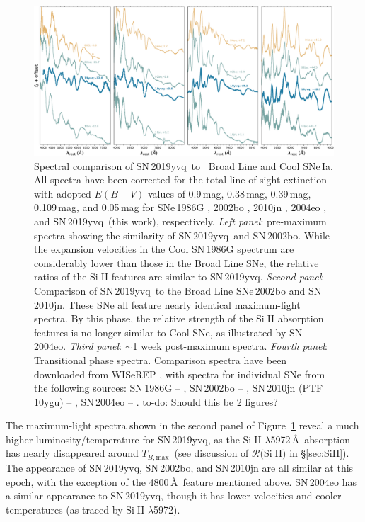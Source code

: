 \documentclass[twocolumn]{aastex63}
\def\ion#1#2{#1$\;${\footnotesize\rm{#2}}\relax}
\newcommand{\todo}[1]{{\color{magenta} to-do: {#1}}}
\newcommand{\tbmax}{$T_{B,\mathrm{max}}$}
\newcommand{\sn}{SN\,2019yvq}
\begin{document}
\begin{figure}
    \centering
    \includegraphics[width=7.25in]{./figures/spec_comp_extinction.pdf}
    \caption{Spectral comparison of \sn\ to \citeauthor{Branch06}~Broad Line
    and Cool SNe\,Ia. All spectra have been corrected for the total
    line-of-sight extinction with adopted $E(B-V)$ values of 0.9\,mag,
    0.38\,mag, 0.39\,mag, 0.109\,mag, and 0.05\,mag for SNe\,1986G
    \citep{Phillips87}, 2002bo \citep{Stehle05}, 2010jn \citep{Hachinger13},
    2004eo \citep{Pastorello07}, and \sn\ (this work), respectively.
    \textit{Left panel}: pre-maximum spectra showing the similarity of \sn\
    and SN\,2002bo. While the expansion velocities in the Cool SN\,1986G
    spectrum are considerably lower than those in the Broad Line SNe, the
    relative ratios of the \ion{Si}{II} features are similar to \sn.
    \textit{Second panel}: Comparison of \sn\ to the Broad Line SNe\,2002bo
    and SN\,2010jn. These SNe all feature nearly identical maximum-light
    spectra. By this phase, the relative strength of the \ion{Si}{II}
    absorption features is no longer similar to \citet{Branch06} Cool SNe, as
    illustrated by SN\,2004eo. \textit{Third panel}: $\sim$1 week post-maximum
    spectra. \textit{Fourth panel}: Transitional phase spectra. Comparison
    spectra have been downloaded from WISeREP \citep{Yaron12}, with spectra
    for individual SNe from the following sources: SN\,1986G --
    \citet{Cristiani92}, SN\,2002bo -- \citet{Benetti04,Silverman11},
    SN\,2010jn (PTF\,10ygu) -- \citet{Hachinger13,Maguire14}, SN\,2004eo --
    \citet{Pastorello07}. \todo{Should this be 2 figures?}}
    \label{fig:spec_comp}
\end{figure}

The maximum-light spectra shown in the second panel of
Figure~\ref{fig:spec_comp} reveal a much higher luminosity/temperature for
\sn, as the \ion{Si}{II} $\lambda$5972\,\AA\ absorption has nearly disappeared
around \tbmax\ (see discussion of $\mathcal{R}($\ion{Si}{II}$)$ in
\S\ref{sec:SiII}). The appearance of \sn, SN\,2002bo, and SN\,2010jn are all
similar at this epoch, with the exception of the 4800\,\AA\ feature mentioned
above. SN\,2004eo has a similar appearance to \sn, though it has lower
velocities and cooler temperatures (as traced by \ion{Si}{II} $\lambda$5972).
\end{document}
